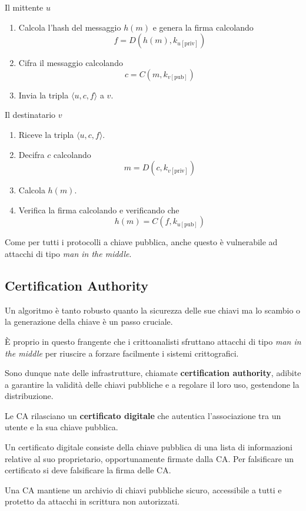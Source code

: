 Il mittente $u$
\begin{enumerate}
	\item Calcola l'hash del messaggio $h(m)$ e genera la firma calcolando
	      \[ f = D(h(m), k_{u [\text{priv}]}) \]
	\item Cifra il messaggio calcolando
	      \[ c = C(m, k_{v [\text{pub}]}) \]
	\item Invia la tripla $\langle u, c, f \rangle$ a $v$.
\end{enumerate}
Il destinatario $v$
\begin{enumerate}
	\item Riceve la tripla $\langle u, c, f \rangle$.
	\item Decifra $c$ calcolando
	      \[ m = D(c, k_{v [\text{priv}]}) \]
	\item Calcola $h(m)$.
	\item Verifica la firma calcolando e verificando che
	      \[ h(m) = C(f, k_{u [\text{pub}]}) \]
\end{enumerate}
Come per tutti i protocolli a chiave pubblica, anche questo \`e vulnerabile ad attacchi di tipo
\emph{man in the middle}.

\subsection{Certification Authority}
Un algoritmo \`e tanto robusto quanto la sicurezza delle sue chiavi ma lo scambio o la generazione della chiave \`e
un passo cruciale.

\`E proprio in questo frangente che i crittoanalisti sfruttano attacchi di tipo \emph{man in the middle} per
riuscire a forzare facilmente i sistemi crittografici.

Sono dunque nate delle infrastrutture, chiamate \textbf{certification authority}, adibite a garantire la validit\`a
delle chiavi pubbliche e a regolare il loro uso, gestendone la distribuzione.

Le CA rilasciano un \textbf{certificato digitale} che autentica l'associazione tra un utente e la sua chiave pubblica.

Un certificato digitale consiste della chiave pubblica di una lista di informazioni relative al suo proprietario,
opportunamente firmate dalla CA. Per falsificare un certificato si deve falsificare la firma delle CA.

Una CA mantiene un archivio di chiavi pubbliche sicuro, accessibile a tutti e protetto da attacchi in scrittura non
autorizzati.

